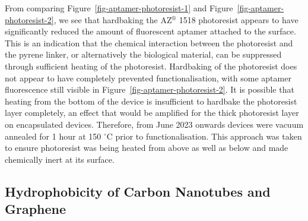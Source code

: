 \documentclass[
  a4paper,
]{scrbook}
\begin{document}
From comparing Figure~\ref{fig-aptamer-photoresist-1} and
Figure~\ref{fig-aptamer-photoresist-2}, we see that hardbaking the
AZ\(^\circledR\) 1518 photoresist appears to have significantly reduced
the amount of fluorescent aptamer attached to the surface. This is an
indication that the chemical interaction between the photoresist and the
pyrene linker, or alternatively the biological material, can be
suppressed through sufficient heating of the photoresist. Hardbaking of
the photoresist does not appear to have completely prevented
functionalisation, with some aptamer fluorescence still visible in
Figure~\ref{fig-aptamer-photoresist-2}. It is possible that heating from
the bottom of the device is insufficient to hardbake the photoresist
layer completely, an effect that would be amplified for the thick
photoresist layer on encapsulated devices. Therefore, from June 2023
onwards devices were vacuum annealed for 1 hour at 150 \(^\circ\)C prior
to functionalisation. This approach was taken to ensure photoresist was
being heated from above as well as below and made chemically inert at
its surface.

\hypertarget{sec-hydrophobicity}{%
\subsection{Hydrophobicity of Carbon Nanotubes and
Graphene}\label{sec-hydrophobicity}}
\end{document}
